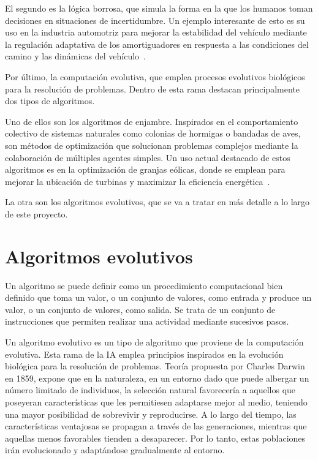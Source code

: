 El segundo es la lógica borrosa, que simula la forma en la que los humanos toman decisiones en situaciones de incertidumbre. Un ejemplo interesante de esto es su uso en la industria automotriz para mejorar la estabilidad del vehículo mediante la regulación adaptativa de los amortiguadores en respuesta a las condiciones del camino y las dinámicas del vehículo~\cite{ivanov2015}.

Por último, la computación evolutiva, que emplea procesos evolutivos biológicos para la resolución de problemas. Dentro de esta rama destacan principalmente dos tipos de algoritmos.

Uno de ellos son los algoritmos de enjambre. Inspirados en el comportamiento colectivo de sistemas naturales como colonias de hormigas o bandadas de aves, son métodos de optimización que solucionan problemas complejos mediante la colaboración de múltiples agentes simples. Un uso actual destacado de estos algoritmos es en la optimización de granjas eólicas, donde se emplean para mejorar la ubicación de turbinas y maximizar la eficiencia energética~\cite{dong2023}.

La otra son los algoritmos evolutivos, que se va a tratar en más detalle a lo largo de este proyecto.
\newpage
\section{Algoritmos evolutivos}

Un algoritmo se puede definir como un procedimiento computacional bien definido que toma un valor, o un conjunto de valores, como entrada y produce un valor, o un conjunto de valores, como salida. Se trata de un conjunto de instrucciones que permiten realizar una actividad mediante sucesivos pasos.

Un algoritmo evolutivo es un tipo de algoritmo que proviene de la computación evolutiva. Esta rama de la IA emplea principios inspirados en la evolución biológica para la resolución de problemas. Teoría propuesta por Charles Darwin en 1859, expone que en la naturaleza, en un entorno dado que puede albergar un número limitado de individuos, la selección natural favorecería a aquellos que poseyeran características que les permitiesen adaptarse mejor al medio, teniendo una mayor posibilidad de sobrevivir y reproducirse. A lo largo del tiempo, las características ventajosas se propagan a través de las generaciones, mientras que aquellas menos favorables tienden a desaparecer. Por lo tanto, estas poblaciones irán evolucionado y adaptándose gradualmente al entorno.

